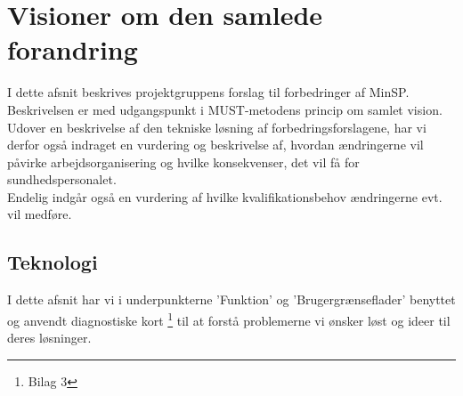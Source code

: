 \section{Visioner om den samlede forandring}
I dette afsnit beskrives projektgruppens forslag til forbedringer af MinSP. Beskrivelsen er med udgangspunkt i MUST-metodens princip om samlet vision.
Udover en beskrivelse af den tekniske løsning af forbedringsforslagene, har vi derfor også indraget en vurdering og beskrivelse af, hvordan ændringerne vil påvirke arbejdsorganisering og hvilke konsekvenser, det vil få for sundhedspersonalet. \\
Endelig indgår også en vurdering af hvilke kvalifikationsbehov ændringerne evt. vil medføre.
\subsection{Teknologi}
I dette afsnit har vi i underpunkterne 'Funktion' og 'Brugergrænseflader' benyttet og anvendt diagnostiske kort \footnote{Bilag 3} til at forstå problemerne vi ønsker løst og ideer til deres løsninger. \\
%
%
